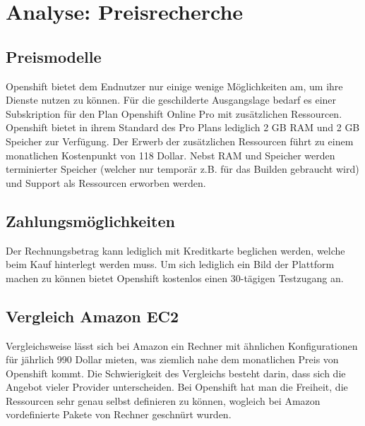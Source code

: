 \documentclass[12pt,a4paper]{article}
\begin{document}
\section{Analyse: Preisrecherche}

\subsection{Preismodelle}
Openshift bietet dem Endnutzer nur einige wenige Möglichkeiten am, um ihre Dienste nutzen zu können. Für die geschilderte Ausgangslage bedarf es einer Subskription für den Plan Openshift Online Pro mit zusätzlichen Ressourcen. Openshift bietet in ihrem Standard des
Pro Plans lediglich 2 GB RAM und 2 GB Speicher zur Verfügung. Der Erwerb der zusätzlichen Ressourcen führt zu einem monatlichen Kostenpunkt von 118 Dollar. Nebst RAM und Speicher werden terminierter Speicher (welcher nur temporär z.B. für das Builden gebraucht wird)
und Support als Ressourcen erworben werden.

\subsection{Zahlungsmöglichkeiten}
Der Rechnungsbetrag kann lediglich mit Kreditkarte beglichen werden, welche beim Kauf hinterlegt werden muss. Um sich lediglich ein Bild der Plattform machen zu können bietet Openshift kostenlos einen 30-tägigen Testzugang an.

\subsection{Vergleich Amazon EC2}
Vergleichsweise lässt sich bei Amazon ein Rechner mit ähnlichen Konfigurationen für jährlich 990 Dollar mieten, was ziemlich nahe dem monatlichen Preis von Openshift kommt. Die Schwierigkeit des Vergleichs besteht darin, dass sich die Angebot vieler Provider unterscheiden.
Bei Openshift hat man die Freiheit, die Ressourcen sehr genau selbst definieren zu können, wogleich bei Amazon vordefinierte Pakete von Rechner geschnürt wurden.
\end{document}
